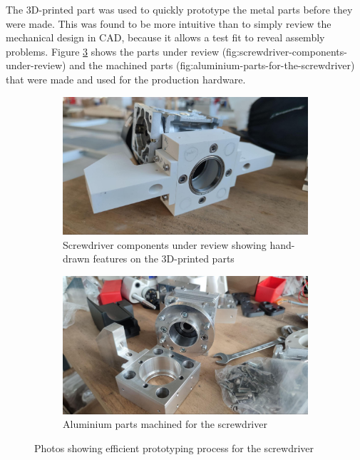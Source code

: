 The 3D-printed part was used to quickly prototype the metal parts before they were made. This was found to be more intuitive than to simply review the mechanical design in CAD, because it allows a test fit to reveal assembly problems. Figure \ref{fig:efficient-prototyping-process-for-the-screwdriver} shows the parts under review ({fig:screwdriver-components-under-review}) and the machined parts ({fig:aluminium-parts-for-the-screwdriver}) that were made and used for the production hardware.

\begin{figure}[!h]
    \centering
    \begin{subfigure}[b]{0.49\textwidth}
        \centering
        \includegraphics[width=\textwidth]{images/7a/img50.jpg}
        \caption{Screwdriver components under review showing hand-drawn features on the 3D-printed parts}
        \label{fig:screwdriver-components-under-review}
    \end{subfigure}
    \hfill
    \begin{subfigure}[b]{0.49\textwidth}
        \centering
        \includegraphics[width=\textwidth]{images/7a/img51.jpg}
        \caption{Aluminium parts machined for the screwdriver}
        \label{fig:aluminium-parts-for-the-screwdriver}
    \end{subfigure}
    \caption{Photos showing efficient prototyping process for the screwdriver}
    \label{fig:efficient-prototyping-process-for-the-screwdriver}
\end{figure}

